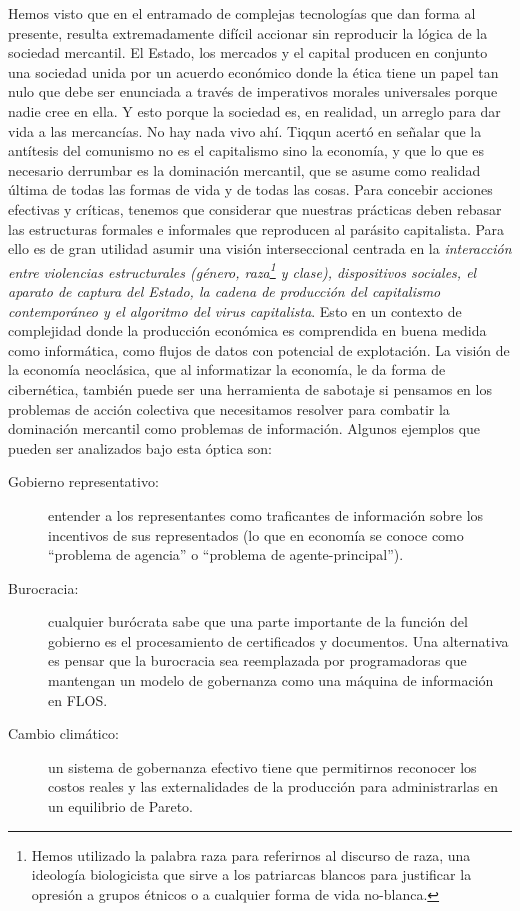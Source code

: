 Hemos visto que en el entramado de complejas tecnologías que dan forma al presente, resulta extremadamente difícil accionar sin reproducir la lógica de la sociedad mercantil. El Estado, los mercados y el capital producen en conjunto una sociedad unida por un acuerdo económico donde la ética tiene un papel tan nulo que debe ser enunciada a través de imperativos morales universales porque nadie cree en ella. Y esto porque la sociedad es, en realidad, un arreglo para dar vida a las mercancías. No hay nada vivo ahí. Tiqqun acertó en señalar que la antítesis del comunismo no es el capitalismo sino la economía, y que lo que es necesario derrumbar es la dominación mercantil, que se asume como realidad última de todas las formas de vida y de todas las cosas. Para concebir acciones efectivas y críticas, tenemos que considerar que nuestras prácticas deben rebasar las estructuras formales e informales que reproducen al parásito capitalista. Para ello es de gran utilidad asumir una visión interseccional centrada en la \emph{interacción entre violencias estructurales (género, raza\footnote{Hemos utilizado la palabra raza para referirnos al discurso de raza, una ideología biologicista que sirve a los patriarcas blancos para justificar la opresión a grupos étnicos o a cualquier forma de vida no-blanca.} y clase), dispositivos sociales, el aparato de captura del Estado, la cadena de producción del capitalismo contemporáneo y el algoritmo del virus capitalista}. Esto en un contexto de complejidad donde la producción económica es comprendida en buena medida como informática, como flujos de datos con potencial de explotación. La visión de la economía neoclásica, que al informatizar la economía, le da forma de cibernética, también puede ser una herramienta de sabotaje si pensamos en los problemas de acción colectiva que necesitamos resolver para combatir la dominación mercantil como problemas de información. Algunos ejemplos que pueden ser analizados bajo esta óptica son:

\begin{description}
	\item[Gobierno representativo:] entender a los representantes como traficantes de información sobre los incentivos de sus representados (lo que en economía se conoce como \enquote{problema de agencia}\revquotes{} o \enquote{problema de agente-principal}\revquotes{}).

	\item[Burocracia:] cualquier burócrata sabe que una parte importante de la función del gobierno es el procesamiento de certificados y documentos. Una alternativa es pensar que la burocracia sea reemplazada por programadoras que mantengan un modelo de gobernanza como una máquina de información en FLOS.

	\item[Cambio climático:] un sistema de gobernanza efectivo tiene que permitirnos reconocer los costos reales y las externalidades de la producción para administrarlas en un equilibrio de Pareto.
\end{description}

